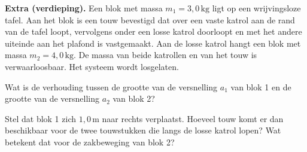 \documentclass{ximera}
\begin{document}
\begin{exercise}
    \textbf{Extra (verdieping).} Een blok met massa $m_{1}= 3{,}0 \, \mathrm{kg}$ ligt op een wrijvingsloze tafel. Aan het blok is een touw bevestigd dat over een vaste katrol aan de rand van de tafel loopt, vervolgens onder een losse katrol doorloopt en met het andere uiteinde aan het plafond is vastgemaakt. Aan de losse katrol hangt een blok met massa $m_{2}= 4{,}0 \, \mathrm{kg}$. De massa van beide katrollen en van het touw is verwaarloosbaar. Het systeem wordt losgelaten.

    \begin{center}
    \end{center}

    \begin{question}
        Wat is de verhouding tussen de grootte van de versnelling $a_{1}$ van blok 1 en de grootte van de versnelling $a_{2}$ van blok 2?


        \begin{hint}
            Stel dat blok 1 zich $1{,}0 \, \mathrm{m}$ naar rechts verplaatst. Hoeveel touw komt er dan beschikbaar voor de twee touwstukken die langs de losse katrol lopen? Wat betekent dat voor de zakbeweging van blok 2?
        \end{hint}


\end{question}
\end{exercise}
\end{document}
